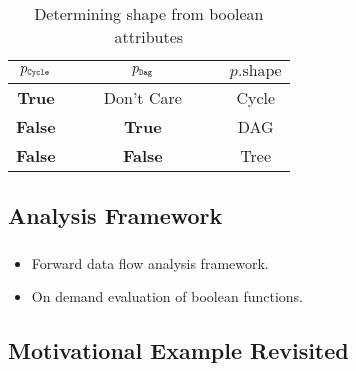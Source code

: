 \documentclass[mathserif,10pt]{beamer}
\newcommand{\cmt}[1]{}
\newcommand{\Dag}{{\tt Dag}}
\newcommand{\Cycle}{{\tt Cycle}}
\newcommand{\p}{\ensuremath{p}}
\newcommand{\shape}{\mbox{shape}}
\newcommand{\subC}{\mbox{\scalebox{0.6}{\Cycle}}}
\newcommand{\subD}{\mbox{\scalebox{0.6}{\Dag}}}
\newcommand{\false}{\textbf{False}}
\newcommand{\true}{\textbf{True}}
\begin{document}
{\frame
{
	\frametitle{\subsecname}
	\cmt{\begin{itemize}
	\item The shape of \p, \p.\shape, can be obtained by evaluating the functions for the attributes $\p_{\subC}$ and
          $\p_{\subD}$, and using following Table.}
		  \begin{table}
			\caption{Determining shape from boolean
			  attributes}
			\begin{center}
			\begin{tabular}{|cc|cc|c| }
			\hline
			$\p_{\subC}$ &$\quad$ & $\p_{\subD}$ &$\quad$& $\p.\shape$ \\ 
			\hline
			\true  && Don't Care  && Cycle        \\ 
			\false  && \true          && DAG    \\ 
			\false  && \false          && Tree   \\ 
			\hline
			\end{tabular}
			\end{center}
		\end{table}

	\cmt{\end{itemize}}
}

\subsection{Analysis Framework}
\frame
{
	\frametitle{\subsecname}
	
	\begin{itemize}
	\item Forward data flow analysis framework. \cmt{ where the data flow values are the $D_F$, $I_F$ and 
	the boolean variables.}
	\pause
	\item On demand evaluation of boolean functions.
	\cmt{We do not evaluate the boolean functions immediately, but associate
the unevaluated functions with the statements. When we want to find out the shape at a given
statement, only then we evaluate the function using the $D_F$ and $I_F$ matrices, and the values of
boolean variables at that statement.}
	\cmt{\pause
	\item Field connectivity information is updated directly by the statement.}
	\end{itemize}
}

\subsection{Motivational Example Revisited}
\frame
{
	\frametitle{\subsecname}
	
}}
\end{document}
